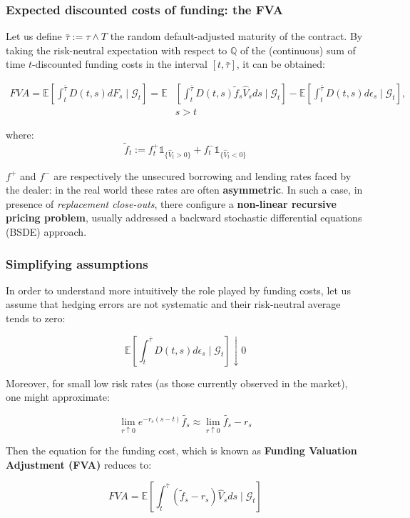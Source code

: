 \documentclass{beamer}
\begin{document}
\begin{frame}
\frametitle{Expected discounted costs of funding: the FVA}

	\footnotesize{Let us define $\bar{\tau} := \tau \wedge T$ the random default-adjusted maturity of the contract. By taking the risk-neutral expectation with respect to $\mathbb{Q}$ of the (continuous) sum of time $t$-discounted funding costs in the interval $[t,\bar{\tau} ]$, it can be obtained:

	\begin{equation}
	\begin{split}
		FVA = \mathbb{E} \left[   \int_{t}^{\bar{\tau}}  D(t,s) dF_{s} \mid \mathcal{G}_t \right] = \mathbb{E} &\left[   \int_{t}^{\bar{\tau}}  D(t,s) \tilde{f}_{s}\hat{V}_{s} ds \mid \mathcal{G}_t \right] - \mathbb{E} \left[   \int_{t}^{\bar{\tau}} D(t,s) d\epsilon_{s} \mid \mathcal{G}_t \right],\\
	&s>t
	\end{split}
	\end{equation} }

	where:
	$$
	\tilde{f}_{t} := f^{+}_{t}\mathds{1}_{ \{ \hat{V}_{t}>0 \} } + f^{-}_{t}\mathds{1}_{ \{\hat{V}_{t}<0 \}}
	$$

	$f^{+}$ and $f^{-}$ are respectively the unsecured borrowing and lending rates faced by the dealer: in the real world these rates are often \textbf{asymmetric}. In such a case, in presence of \textit{replacement close-outs}, there configure a \textbf{non-linear recursive pricing problem}, usually addressed a backward stochastic differential equations (BSDE) approach. 
\end{frame}

\begin{frame}
\frametitle{Simplifying assumptions}
	In order to understand more intuitively the role played by funding costs, let us assume that hedging errors are not systematic and their risk-neutral average tends to zero:

	$$ \mathbb{E} \left[ \int_{t}^{\bar{\tau} } D(t,s) d\epsilon_{s} \mid \mathcal{G}_t  \right] \downarrow 0 $$

	Moreover, for small low risk rates (as those currently observed in the market), one might approximate:

	\begin{equation}
		\lim_{r\uparrow 0} e^{-r_s (s-t)} \tilde{f_s} \approx \lim_{r\uparrow 0} \tilde{f_s} - r_s
	\end{equation}

	Then the equation for the funding cost, which is known as \textbf{Funding Valuation Adjustment (FVA)} reduces to:
	
	\begin{equation}
		FVA = \mathbb{E} \left[  \int_{t}^{\bar{\tau} }  (\tilde{f}_{s} - r_{s})\hat{V}_{s}ds \mid \mathcal{G}_t \right]
	\end{equation}

\end{frame}
\end{document}
